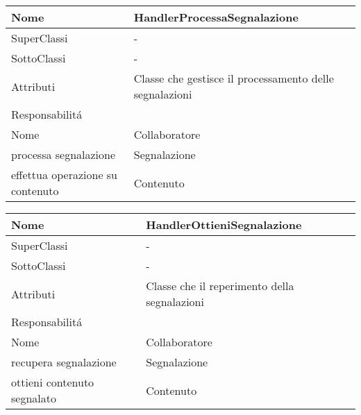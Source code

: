 \begin{center}
    \begin{tabular}{ |p{3cm}|p{3cm}|p{3cm}|p{3cm}| }
        \hline
        Nome & \multicolumn{3}{|p{9cm}|}{HandlerProcessaSegnalazione} \\\hline
        SuperClassi & \multicolumn{3}{|p{9cm}|}{-} \\\hline
        SottoClassi & \multicolumn{3}{|p{9cm}|}{-} \\\hline
        Attributi & \multicolumn{3}{|p{9cm}|}{Classe che gestisce il processamento delle segnalazioni} \\\hline
        \multicolumn{4}{|p{12cm}|}{Responsabilit\'a} \\\hline
        \multicolumn{2}{|p{6cm}|}{Nome} & \multicolumn{2}{|p{6cm}|}{Collaboratore} \\\hline
        \multicolumn{2}{|p{6cm}|}{processa segnalazione} & \multicolumn{2}{|p{6cm}|}{Segnalazione} \\\hline
        \multicolumn{2}{|p{6cm}|}{effettua operazione su contenuto} & \multicolumn{2}{|p{6cm}|}{Contenuto} \\\hline
    \end{tabular}
\end{center}

\begin{center}
    \begin{tabular}{ |p{3cm}|p{3cm}|p{3cm}|p{3cm}| }
        \hline
        Nome & \multicolumn{3}{|p{9cm}|}{HandlerOttieniSegnalazione} \\\hline
        SuperClassi & \multicolumn{3}{|p{9cm}|}{-} \\\hline
        SottoClassi & \multicolumn{3}{|p{9cm}|}{-} \\\hline
        Attributi & \multicolumn{3}{|p{9cm}|}{Classe che il reperimento della segnalazioni} \\\hline
        \multicolumn{4}{|p{12cm}|}{Responsabilit\'a} \\\hline
        \multicolumn{2}{|p{6cm}|}{Nome} & \multicolumn{2}{|p{6cm}|}{Collaboratore} \\\hline
        \multicolumn{2}{|p{6cm}|}{recupera segnalazione} & \multicolumn{2}{|p{6cm}|}{Segnalazione} \\\hline
        \multicolumn{2}{|p{6cm}|}{ottieni contenuto segnalato} & \multicolumn{2}{|p{6cm}|}{Contenuto} \\\hline
    \end{tabular}
\end{center}

